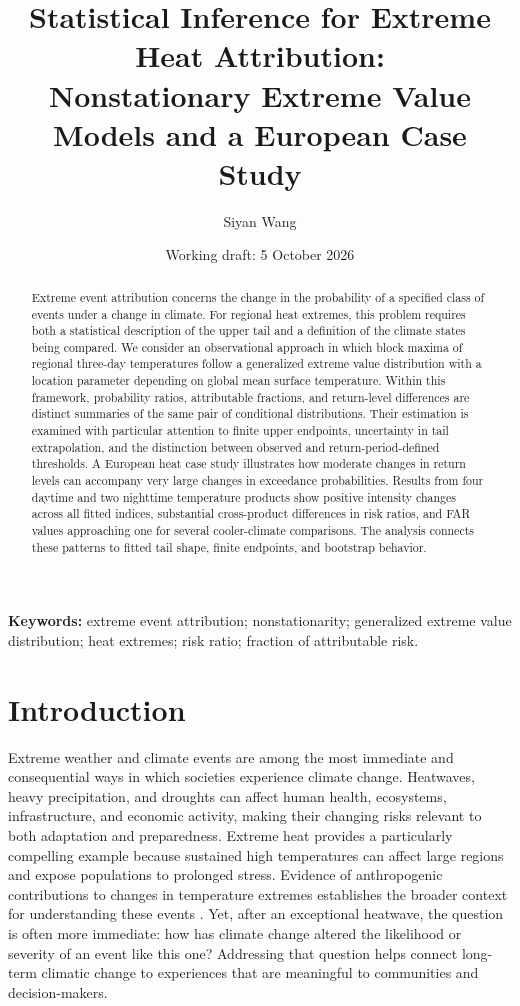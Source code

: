 \documentclass[11pt]{article}
\title{Statistical Inference for Extreme Heat Attribution:\\
Nonstationary Extreme Value Models and a European Case Study}
\author{Siyan Wang}
\date{Working draft: 5 October 2026}
\begin{document}
\maketitle
\begin{abstract}
Extreme event attribution concerns the change in the probability of a
specified class of events under a change in climate. For regional heat
extremes, this problem requires both a statistical description of the
upper tail and a definition of the climate states being compared. We
consider an observational approach in which block maxima of regional
three-day temperatures follow a generalized extreme value distribution
with a location parameter depending on global mean surface temperature.
Within this framework, probability ratios, attributable fractions, and
return-level differences are distinct summaries of the same pair of
conditional distributions. Their estimation is examined with particular
attention to finite upper endpoints, uncertainty in tail extrapolation,
and the distinction between observed and return-period-defined thresholds.
A European heat case study illustrates how moderate changes in return
levels can accompany very large changes in exceedance probabilities.
Results from four daytime and two nighttime temperature products show
positive intensity changes across all fitted indices, substantial
cross-product differences in risk ratios, and FAR values approaching
one for several cooler-climate comparisons. The analysis connects these
patterns to fitted tail shape, finite endpoints, and bootstrap behavior.
\end{abstract}
\noindent\textbf{Keywords:} extreme event attribution; nonstationarity;
generalized extreme value distribution; heat extremes; risk ratio;
fraction of attributable risk.

\section{Introduction}
Extreme weather and climate events are among the most immediate and
consequential ways in which societies experience climate change.
Heatwaves, heavy precipitation, and droughts can affect human health,
ecosystems, infrastructure, and economic activity, making their
changing risks relevant to both adaptation and preparedness. Extreme
heat provides a particularly compelling example because sustained high
temperatures can affect large regions and expose populations to
prolonged stress. Evidence of anthropogenic contributions to changes
in temperature extremes establishes the broader context for
understanding these events \cite{kim2016attribution}. Yet, after an
exceptional
heatwave, the question is often more immediate: how has climate change
altered the likelihood or severity of an event like this one?
Addressing that question helps connect long-term climatic change to
experiences that are meaningful to communities and decision-makers.
\end{document}
